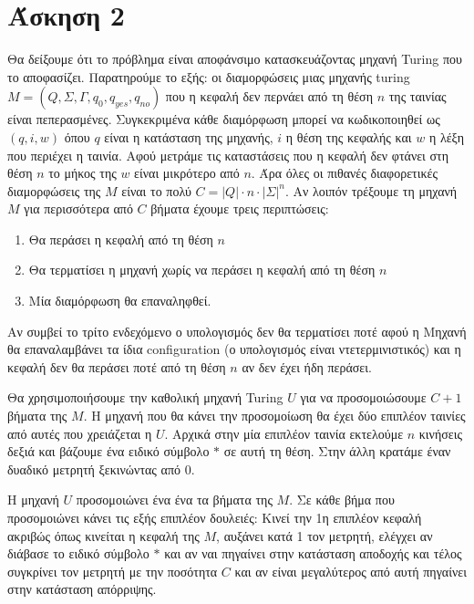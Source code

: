 \documentclass[11pt]{article}
\begin{document}


\section*{Άσκηση 2}
Θα δείξουμε ότι το πρόβλημα είναι αποφάνσιμο κατασκευάζοντας μηχανή Turing που το αποφασίζει.
Παρατηρούμε το εξής: οι διαμορφώσεις μιας μηχανής turing $M=(Q,\Sigma,\Gamma,q_0,q_{yes},q_{no})$ 
που η κεφαλή δεν περνάει από τη θέση $n$ της ταινίας είναι πεπερασμένες. Συγκεκριμένα κάθε διαμόρφωση μπορεί
να κωδικοποιηθεί ως $(q,i,w)$ όπου $q$ είναι η κατάσταση της μηχανής, $i$ η θέση της κεφαλής και $w$ η 
λέξη που περιέχει η ταινία.  Αφού μετράμε τις καταστάσεις που η κεφαλή δεν φτάνει στη θέση $n$ το
μήκος της $w$ είναι μικρότερο από $n$.  Άρα όλες οι πιθανές διαφορετικές διαμορφώσεις της $M$ είναι το 
πολύ $C=|Q|\cdot n\cdot |\Sigma|^n$. Αν λοιπόν τρέξουμε τη μηχανή $M$ για περισσότερα από $C$ βήματα
έχουμε τρεις περιπτώσεις: 
\begin{enumerate}
    \item Θα περάσει η κεφαλή από τη θέση $n$
    \item Θα τερματίσει η μηχανή χωρίς να περάσει η κεφαλή από τη θέση $n$
    \item Μία διαμόρφωση θα επαναληφθεί.
\end{enumerate}
Αν συμβεί το τρίτο ενδεχόμενο ο υπολογισμός δεν θα τερματίσει ποτέ αφού η Μηχανή θα επαναλαμβάνει 
τα ίδια configuration (ο υπολογισμός είναι ντετερμινιστικός) και η κεφαλή δεν θα περάσει ποτέ από 
τη θέση $n$ αν δεν έχει ήδη περάσει.

Θα χρησιμοποιήσουμε την καθολική μηχανή Turing $U$ για να προσομοιώσουμε $C+1$ βήματα της $M$. 
Η μηχανή που θα κάνει την προσομοίωση θα έχει δύο επιπλέον ταινίες από αυτές που χρειάζεται 
η $U$. Αρχικά στην μία επιπλέον ταινία εκτελούμε $n$ κινήσεις δεξιά και βάζουμε ένα ειδικό 
σύμβολο $*$ σε αυτή τη θέση. Στην άλλη κρατάμε έναν δυαδικό μετρητή ξεκινώντας από $0$. 

Η μηχανή $U$ προσομοιώνει ένα ένα τα βήματα της $Μ$. Σε κάθε βήμα που προσομοιώνει κάνει τις εξής
επιπλέον δουλειές: Κινεί την 1η επιπλέον κεφαλή ακριβώς όπως κινείται η κεφαλή της $M$, αυξάνει 
κατά 1 τον μετρητή, ελέγχει αν διάβασε το ειδικό σύμβολο $*$ και αν ναι πηγαίνει στην κατάσταση αποδοχής 
και τέλος συγκρίνει τον μετρητή με την ποσότητα $C$ και αν είναι μεγαλύτερος από αυτή πηγαίνει 
στην κατάσταση απόρριψης.
                                                              
\end{document}
